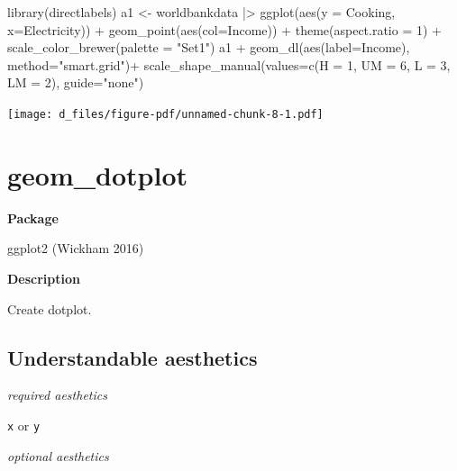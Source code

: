 \documentclass[
  letterpaper,
  DIV=11,
  numbers=noendperiod]{scrreprt}
\newenvironment{Shaded}{\begin{snugshade}}{\end{snugshade}}
\newcommand{\AttributeTok}[1]{\textcolor[rgb]{0.40,0.45,0.13}{#1}}
\newcommand{\DecValTok}[1]{\textcolor[rgb]{0.68,0.00,0.00}{#1}}
\newcommand{\FunctionTok}[1]{\textcolor[rgb]{0.28,0.35,0.67}{#1}}
\newcommand{\NormalTok}[1]{\textcolor[rgb]{0.00,0.23,0.31}{#1}}
\newcommand{\OtherTok}[1]{\textcolor[rgb]{0.00,0.23,0.31}{#1}}
\newcommand{\SpecialCharTok}[1]{\textcolor[rgb]{0.37,0.37,0.37}{#1}}
\newcommand{\StringTok}[1]{\textcolor[rgb]{0.13,0.47,0.30}{#1}}
\begin{document}
\begin{Shaded}
\begin{Highlighting}[]
\FunctionTok{library}\NormalTok{(directlabels)}
\NormalTok{a1 }\OtherTok{\textless{}{-}}\NormalTok{ worldbankdata }\SpecialCharTok{|\textgreater{}}
  \FunctionTok{ggplot}\NormalTok{(}\FunctionTok{aes}\NormalTok{(}\AttributeTok{y =}\NormalTok{ Cooking, }\AttributeTok{x=}\NormalTok{Electricity)) }\SpecialCharTok{+}   
  \FunctionTok{geom\_point}\NormalTok{(}\FunctionTok{aes}\NormalTok{(}\AttributeTok{col=}\NormalTok{Income)) }\SpecialCharTok{+}
  \FunctionTok{theme}\NormalTok{(}\AttributeTok{aspect.ratio =} \DecValTok{1}\NormalTok{) }\SpecialCharTok{+}
  \FunctionTok{scale\_color\_brewer}\NormalTok{(}\AttributeTok{palette =} \StringTok{"Set1"}\NormalTok{)}
\NormalTok{a1 }\SpecialCharTok{+}
  \FunctionTok{geom\_dl}\NormalTok{(}\FunctionTok{aes}\NormalTok{(}\AttributeTok{label=}\NormalTok{Income), }\AttributeTok{method=}\StringTok{"smart.grid"}\NormalTok{)}\SpecialCharTok{+}
  \FunctionTok{scale\_shape\_manual}\NormalTok{(}\AttributeTok{values=}\FunctionTok{c}\NormalTok{(}\AttributeTok{H =} \DecValTok{1}\NormalTok{, }
                              \AttributeTok{UM =} \DecValTok{6}\NormalTok{,}
                              \AttributeTok{L =} \DecValTok{3}\NormalTok{,}
                              \AttributeTok{LM =} \DecValTok{2}\NormalTok{),}
                     \AttributeTok{guide=}\StringTok{"none"}\NormalTok{)}
\end{Highlighting}
\end{Shaded}

\texttt{[image: d\_files/figure-pdf/unnamed-chunk-8-1.pdf]}

\section{geom\_dotplot}\label{dotplot}

\textbf{Package}

ggplot2 (Wickham 2016)

\textbf{Description}

Create dotplot.

\subsection{Understandable aesthetics}\label{understandable-aesthetics}

\emph{required aesthetics}

\texttt{x} or \texttt{y}

\emph{optional aesthetics}
\end{document}
